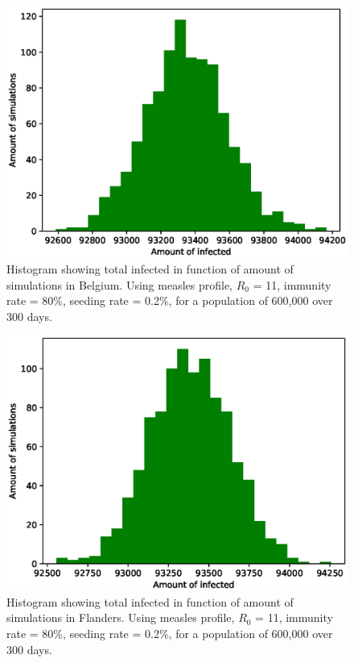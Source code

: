 \documentclass{article}
\begin{document}
\begin{figure}
	\centering
	\includegraphics[width=\linewidth]{./Belgie/HIST_SR=02.eps}
	\caption{Histogram showing total infected in function of amount of simulations in Belgium. Using measles profile, $R_0$ = 11, immunity rate = 80\%, seeding rate = 0.2\%, for a population of 600,000 over 300 days.}
	\label{HIST_Belgium}
\end{figure}

\begin{figure}
	\centering
	\includegraphics[width=\linewidth]{./Vlaanderen/HIST_SR=02.eps}
	\caption{Histogram showing total infected in function of amount of simulations in Flanders. Using measles profile, $R_0$ = 11, immunity rate = 80\%, seeding rate = 0.2\%, for a population of 600,000 over 300 days.}
	\label{HIST_Flanders}
\end{figure}
\end{document}
